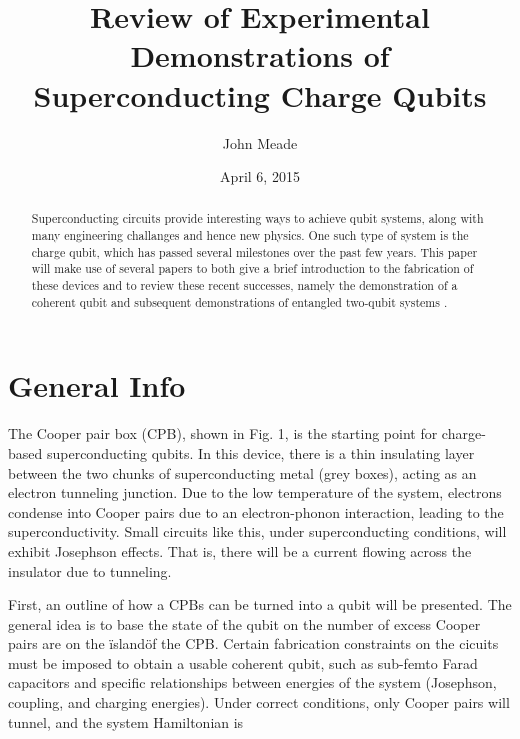 \documentclass[12pt,letterpaper,notitlepage]{report}
\begin{document}
\title{Review of Experimental Demonstrations of Superconducting Charge Qubits}
\author{John Meade}
\date{April 6, 2015}

\maketitle

\begin{abstract}
\doublespacing
\noindent
Superconducting circuits provide interesting ways to achieve qubit systems, along with many engineering challanges and hence new physics. One such type of system is the charge qubit, which has passed several milestones over the past few years. This paper will make use of several papers to both give a brief introduction to the fabrication of these devices and to review these recent successes, namely the demonstration of a coherent qubit \cite{singleCooperPair} and subsequent demonstrations of entangled two-qubit systems \cite{twoPulseGates}\cite{onePulseGateNature}\cite{onePulseGatePhysica}.
\end{abstract}

\pagebreak
\doublespacing

%
%

\section*{General Info}

The Cooper pair box (CPB), shown in Fig. 1, is the starting point for charge-based superconducting qubits. In this device, there is a thin insulating layer between the two chunks of superconducting metal (grey boxes), acting as an electron tunneling junction. Due to the low temperature of the system, electrons condense into Cooper pairs due to an electron-phonon interaction, leading to the superconductivity. Small circuits like this, under superconducting conditions, will exhibit Josephson effects. That is, there will be a current flowing across the insulator due to tunneling.

First, an outline of how a CPBs can be turned into a qubit will be presented. The general idea is to base the state of the qubit on the number of excess Cooper pairs are on the \"island\" of the CPB. Certain fabrication constraints on the cicuits must be imposed to obtain a usable coherent qubit, such as sub-femto Farad capacitors and specific relationships between energies of the system (Josephson, coupling, and charging energies). Under correct conditions, only Cooper pairs will tunnel, and the system Hamiltonian is
\end{document}
